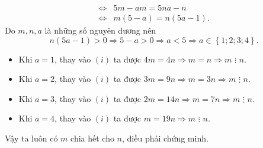 \begin{ex}
{\begin{enumerate}
{\begin{align*}
\Leftrightarrow& 5m - am = 5na - n\\
\Leftrightarrow& m(5 - a) = n(5a - 1).\tag{i}
\end{align*}}Do $m, n, a$ là những số nguyên dương nên 
$$n(5a - 1) > 0 \Rightarrow 5 - a > 0 \Rightarrow a < 5 \Rightarrow a \in \left\{ {1;2;3;4} \right\}.$$
\begin{itemize}
	\item Khi $a=1$, thay vào $(i)$ ta được $4m = 4n \Rightarrow m = n \Rightarrow m\,\, \vdots \,\,n$.
	\item Khi $a=2$,  thay vào $(i)$ ta được $3m = 9n \Rightarrow m = 3n \Rightarrow m\,\, \vdots \,\,n$.
	\item Khi $a=3$,  thay vào $(i)$ ta được $2m = 14n \Rightarrow m = 7n \Rightarrow m\,\, \vdots \,\,n$.
	\item Khi $a=4$,  thay vào $(i)$ ta được $m = 19n \Rightarrow m\,\, \vdots \,\,n$.
\end{itemize}
Vậy  ta luôn có $m$ chia hết cho $n$, điều phải chứng minh.
    \end{enumerate}
    }
\end{ex}


